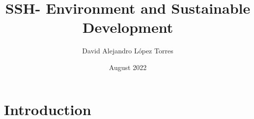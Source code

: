 \documentclass[11pt,letterpaper,spanish]{article}
\title{SSH- Environment and Sustainable Development}
\author{David Alejandro L\'opez Torres}
\date{August 2022}
\theoremstyle{definition}
\begin{document}
\maketitle

\section{Introduction}
\end{document}
